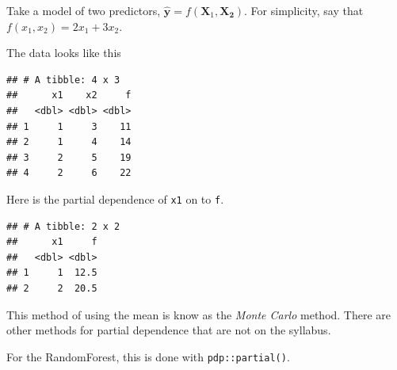 \documentclass[openany]{book}
\newenvironment{Shaded}{\begin{snugshade}}{\end{snugshade}}
\newcommand{\DataTypeTok}[1]{\textcolor[rgb]{0.13,0.29,0.53}{#1}}
\newcommand{\DecValTok}[1]{\textcolor[rgb]{0.00,0.00,0.81}{#1}}
\newcommand{\KeywordTok}[1]{\textcolor[rgb]{0.13,0.29,0.53}{\textbf{#1}}}
\newcommand{\NormalTok}[1]{#1}
\newcommand{\OperatorTok}[1]{\textcolor[rgb]{0.81,0.36,0.00}{\textbf{#1}}}
\newcommand{\StringTok}[1]{\textcolor[rgb]{0.31,0.60,0.02}{#1}}
\begin{document}
Take a model of two predictors, \(\hat{\mathbf{y}} = f(\mathbf{X}_1, \mathbf{X_2})\). For simplicity, say that \(f(x_1, x_2) = 2x_1 + 3x_2\).

The data looks like this

\begin{Shaded}
\end{Shaded}

\begin{verbatim}
## # A tibble: 4 x 3
##      x1    x2     f
##   <dbl> <dbl> <dbl>
## 1     1     3    11
## 2     1     4    14
## 3     2     5    19
## 4     2     6    22
\end{verbatim}

Here is the partial dependence of \texttt{x1} on to \texttt{f}.

\begin{Shaded}
\end{Shaded}

\begin{verbatim}
## # A tibble: 2 x 2
##      x1     f
##   <dbl> <dbl>
## 1     1  12.5
## 2     2  20.5
\end{verbatim}

This method of using the mean is know as the \emph{Monte Carlo} method. There are other methods for partial dependence that are not on the syllabus.

For the RandomForest, this is done with \texttt{pdp::partial()}.
\end{document}
